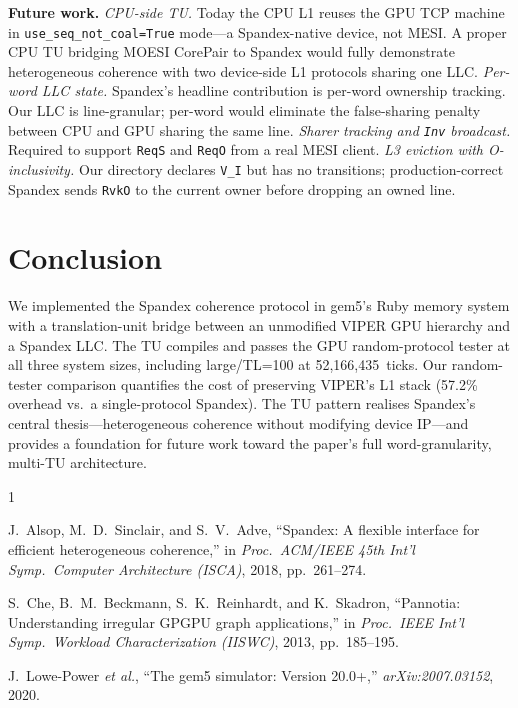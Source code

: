 \documentclass[conference,letterpaper,10pt]{IEEEtran}
\def\spxRTlarge{52{,}166{,}435}
\def\spxRToverhead{57.2}
\begin{document}
\textbf{Future work.}
\emph{CPU-side TU.} Today the CPU L1 reuses the GPU TCP machine in
\texttt{use\_seq\_not\_coal=True} mode---a Spandex-native device, not
MESI. A proper CPU TU bridging MOESI CorePair to Spandex would
fully demonstrate heterogeneous coherence with two device-side L1
protocols sharing one LLC.
\emph{Per-word LLC state.} Spandex's headline contribution is per-word
ownership tracking. Our LLC is line-granular; per-word would
eliminate the false-sharing penalty between CPU and GPU sharing the
same line.
\emph{Sharer tracking and \texttt{Inv} broadcast.} Required to support
\texttt{ReqS} and \texttt{ReqO} from a real MESI client.
\emph{L3 eviction with O-inclusivity.} Our directory declares
\texttt{V\_I} but has no transitions; production-correct Spandex
sends \texttt{RvkO} to the current owner before dropping an owned line.

\section{Conclusion}

We implemented the Spandex coherence protocol in gem5's Ruby memory
system with a translation-unit bridge between an unmodified VIPER GPU
hierarchy and a Spandex LLC. The TU compiles and passes the GPU
random-protocol tester at all three system sizes, including
large/TL=100 at \spxRTlarge\ ticks. Our random-tester comparison
quantifies the cost of preserving VIPER's L1 stack
(\spxRToverhead\% overhead vs.\ a single-protocol Spandex). The TU
pattern realises Spandex's central thesis---heterogeneous coherence
without modifying device IP---and provides a foundation for future
work toward the paper's full word-granularity, multi-TU architecture.

\begin{thebibliography}{1}

J.~Alsop, M.~D.~Sinclair, and S.~V.~Adve, ``Spandex: A flexible
interface for efficient heterogeneous coherence,'' in \emph{Proc.\
ACM/IEEE 45th Int'l Symp.\ Computer Architecture (ISCA)},
2018, pp.~261--274.

S.~Che, B.~M.~Beckmann, S.~K.~Reinhardt, and K.~Skadron, ``Pannotia:
Understanding irregular GPGPU graph applications,'' in \emph{Proc.\
IEEE Int'l Symp.\ Workload Characterization (IISWC)}, 2013,
pp.~185--195.

J.~Lowe-Power \emph{et al.}, ``The gem5 simulator: Version 20.0+,''
\emph{arXiv:2007.03152}, 2020.

\end{thebibliography}
\end{document}

